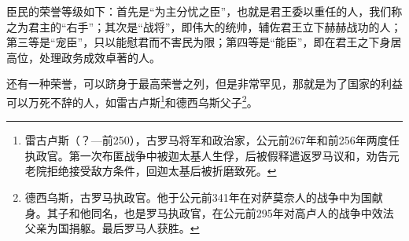 \par 臣民的荣誉等级如下：首先是“为主分忧之臣”，也就是君王委以重任的人，我们称之为君主的“右手”；其次是“战将”，即伟大的统帅，辅佐君王立下赫赫战功的人；第三等是“宠臣”，只以能慰君而不害民为限；第四等是“能臣”，即在君王之下身居高位，处理政务成效卓著的人。
\par 还有一种荣誉，可以跻身于最高荣誉之列，但是非常罕见，那就是为了国家的利益可以万死不辞的人，如雷古卢斯\footnote{雷古卢斯（？—前250），古罗马将军和政治家，公元前267年和前256年两度任执政官。第一次布匿战争中被迦太基人生俘，后被假释遣返罗马议和，劝告元老院拒绝接受敌方条件，回迦太基后被折磨致死。}和德西乌斯父子\footnote{德西乌斯，古罗马执政官。他于公元前341年在对萨莫奈人的战争中为国献身。其子和他同名，也是罗马执政官，在公元前295年对高卢人的战争中效法父亲为国捐躯。最后罗马人获胜。}。



